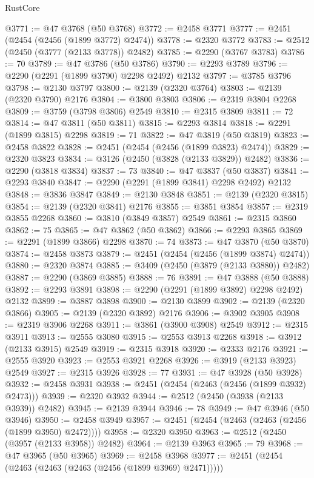 \begin{lexlean}{RustCore}
\begin{coremodule}
@3771 := @47 @3768 (@50 @3768)
@3772 := @2458 @3771
@3777 := @2451 (@2454 (@2456 (@1899 @3772) @2474))
@3778 := @2320 @3772
@3783 := @2512 (@2450 (@3777 (@2133 @3778)) @2482)
@3785 := @2290 (@3767 @3783)
@3786 := 70
@3789 := @47 @3786 (@50 @3786)
@3790 := @2293 @3789
@3796 := @2290 (@2291 (@1899 @3790) @2298 @2492) @2132
@3797 := @3785 @3796
@3798 := @2130 @3797
@3800 := @2139 (@2320 @3764)
@3803 := @2139 (@2320 @3790) @2176
@3804 := @3800 @3803
@3806 := @2319 @3804 @2268
@3809 := @3759 (@3798 @3806) @2549
@3810 := @2315 @3809
@3811 := 72
@3814 := @47 @3811 (@50 @3811)
@3815 := @2293 @3814
@3818 := @2291 (@1899 @3815) @2298
@3819 := 71
@3822 := @47 @3819 (@50 @3819)
@3823 := @2458 @3822
@3828 := @2451 (@2454 (@2456 (@1899 @3823) @2474))
@3829 := @2320 @3823
@3834 := @3126 (@2450 (@3828 (@2133 @3829)) @2482)
@3836 := @2290 (@3818 @3834)
@3837 := 73
@3840 := @47 @3837 (@50 @3837)
@3841 := @2293 @3840
@3847 := @2290 (@2291 (@1899 @3841) @2298 @2492) @2132
@3848 := @3836 @3847
@3849 := @2130 @3848
@3851 := @2139 (@2320 @3815)
@3854 := @2139 (@2320 @3841) @2176
@3855 := @3851 @3854
@3857 := @2319 @3855 @2268
@3860 := @3810 (@3849 @3857) @2549
@3861 := @2315 @3860
@3862 := 75
@3865 := @47 @3862 (@50 @3862)
@3866 := @2293 @3865
@3869 := @2291 (@1899 @3866) @2298
@3870 := 74
@3873 := @47 @3870 (@50 @3870)
@3874 := @2458 @3873
@3879 := @2451 (@2454 (@2456 (@1899 @3874) @2474))
@3880 := @2320 @3874
@3885 := @3409 (@2450 (@3879 (@2133 @3880)) @2482)
@3887 := @2290 (@3869 @3885)
@3888 := 76
@3891 := @47 @3888 (@50 @3888)
@3892 := @2293 @3891
@3898 := @2290 (@2291 (@1899 @3892) @2298 @2492) @2132
@3899 := @3887 @3898
@3900 := @2130 @3899
@3902 := @2139 (@2320 @3866)
@3905 := @2139 (@2320 @3892) @2176
@3906 := @3902 @3905
@3908 := @2319 @3906 @2268
@3911 := @3861 (@3900 @3908) @2549
@3912 := @2315 @3911
@3913 := @2555 @3080
@3915 := @2553 @3913 @2268
@3918 := @3912 (@2133 @3915) @2549
@3919 := @2315 @3918
@3920 := @2333 @2176
@3921 := @2555 @3920
@3923 := @2553 @3921 @2268
@3926 := @3919 (@2133 @3923) @2549
@3927 := @2315 @3926
@3928 := 77
@3931 := @47 @3928 (@50 @3928)
@3932 := @2458 @3931
@3938 := @2451 (@2454 (@2463 (@2456 (@1899 @3932) @2473)))
@3939 := @2320 @3932
@3944 := @2512 (@2450 (@3938 (@2133 @3939)) @2482)
@3945 := @2139 @3944
@3946 := 78
@3949 := @47 @3946 (@50 @3946)
@3950 := @2458 @3949
@3957 := @2451 (@2454 (@2463 (@2463 (@2456 (@1899 @3950) @2472))))
@3958 := @2320 @3950
@3963 := @2512 (@2450 (@3957 (@2133 @3958)) @2482)
@3964 := @2139 @3963
@3965 := 79
@3968 := @47 @3965 (@50 @3965)
@3969 := @2458 @3968
@3977 := @2451 (@2454 (@2463 (@2463 (@2463 (@2456 (@1899 @3969) @2471)))))

\end{coremodule}
\end{lexlean}
